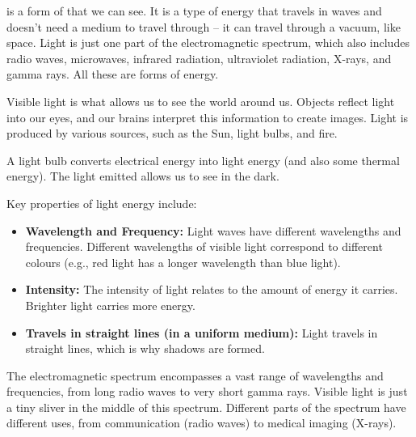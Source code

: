  is a form of  that we can see.  It is a type of energy that travels in waves and doesn't need a medium to travel through – it can travel through a vacuum, like space.  Light is just one part of the electromagnetic spectrum, which also includes radio waves, microwaves, infrared radiation, ultraviolet radiation, X-rays, and gamma rays. All these are forms of energy.


Visible light is what allows us to see the world around us.  Objects reflect light into our eyes, and our brains interpret this information to create images.  Light is produced by various sources, such as the Sun, light bulbs, and fire.

\begin{example}
A light bulb converts electrical energy into light energy (and also some thermal energy). The light emitted allows us to see in the dark.
\end{example}

Key properties of light energy include:

\begin{itemize}
    \item \textbf{Wavelength and Frequency:} Light waves have different wavelengths and frequencies.  Different wavelengths of visible light correspond to different colours (e.g., red light has a longer wavelength than blue light).
    \item \textbf{Intensity:} The intensity of light relates to the amount of energy it carries.  Brighter light carries more energy.
    \item \textbf{Travels in straight lines (in a uniform medium):} Light travels in straight lines, which is why shadows are formed.
\end{itemize}

\begin{marginnote}
The electromagnetic spectrum encompasses a vast range of wavelengths and frequencies, from long radio waves to very short gamma rays.  Visible light is just a tiny sliver in the middle of this spectrum.  Different parts of the spectrum have different uses, from communication (radio waves) to medical imaging (X-rays).
\end{marginnote}

